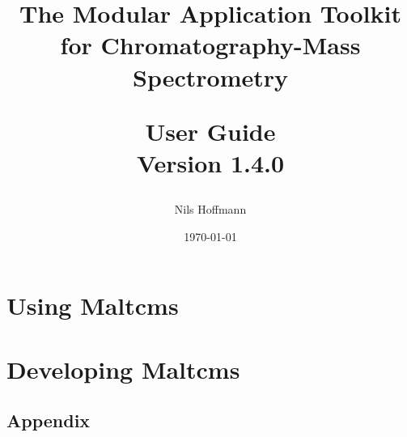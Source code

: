 \documentclass[12pt,a4paper,onecolumn,twoside,titlepage,headsepline,open=any]{scrbook}
\author{Nils Hoffmann}
\title{The Modular Application Toolkit for Chromatography-Mass Spectrometry\\\vspace{1ex}\begin{Large}
User Guide\\
Version 1.4.0
\end{Large}}
\date{\today}
\begin{document}
\frontmatter    %
\maketitle       %





\tableofcontents   %
 
\mainmatter    %

\part{Using Maltcms}


\part{Developing Maltcms}

\backmatter
\chapter{Appendix}
\lstlistoflistings
\printglossaries
\end{document}
